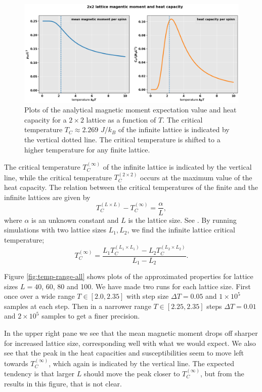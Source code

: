 \documentclass[]{article}
\begin{document}
\begin{figure}[!h]
	\centering
	\includegraphics[width=1\linewidth]{./figs/2x2-mum-cv.png}
	\caption{Plots of the analytical magnetic moment expectation value and heat capacity for a $2 \times 2$ lattice as a function of $T$. The critical temperature $T_C \approx 2.269$ $J/k_B$ of the infinite lattice is indicated by the vertical dotted line. The critical temperature is shifted to a higher temperature for any finite lattice.}
	\label{fig:2x2-mum-cv}
\end{figure}

The critical temperature $T_C^{(\infty)}$ of the infinite lattice is indicated by the vertical line, while the critical temperature $T_C^{(2 \times 2)}$ occurs at the maximum value of the heat capacity. The relation between the critical temperatures of the finite and the infinite lattices are given by
\begin{equation}
	T_C^{(L \times L)} - T_C^{(\infty)} = \frac{\alpha}{L},
\end{equation}
where $\alpha$ is an unknown constant and $L$ is the lattice size. See \cite{fys4150-p4}. By running simulations with two lattice sizes $L_1, L_2$, we find the infinite lattice critical temperature;
\begin{equation}
	T_C^{(\infty)} = \frac{L_1 T_C^{(L_1 \times L_1)} - L_2 T_C^{(L_2 \times L_2)}}{L_1 - L_2}.
\end{equation}

Figure \ref{fig:temp-range-all} shows plots of the approximated properties for lattice sizes $L=40$, 60, 80 and 100. We have made two runs for each lattice size. First once over a wide range $T \in [2.0, 2.35]$ with step size $\Delta T = 0.05$ and $1 \times 10^5$ samples at each step. Then in a narrower range $T \in [2.25, 2.35]$ steps $\Delta T = 0.01$ and $2 \times 10^5$ samples to get a finer precision. 

In the upper right pane we see that the mean magnetic moment drops off sharper for increased lattice size, corresponding well with what we would expect. We also see that the peak in the heat capacities and susceptibilities seem to move left towards $T_C^{(\infty)}$, which again is indicated by the vertical line. The expected tendency is that larger $L$ should move the peak closer to $T_C^{(\infty)}$, but from the results in this figure, that is not clear.
\end{document}
